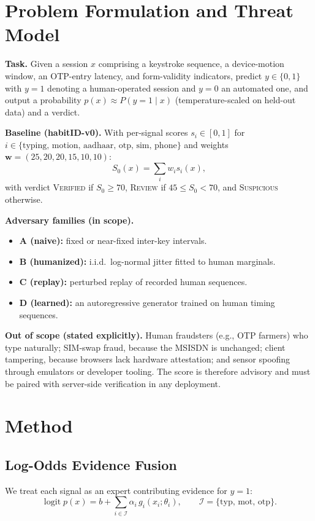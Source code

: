 \documentclass[conference]{IEEEtran}
\newcommand{\hid}{habitID}
\begin{document}
\section{Problem Formulation and Threat Model}
\label{sec:problem}
\textbf{Task.} Given a session $x$ comprising a keystroke sequence, a device-motion window, an OTP-entry latency, and form-validity indicators, predict $y\in\{0,1\}$ with $y{=}1$ denoting a human-operated session and $y{=}0$ an automated one, and output a probability $p(x)\approx P(y{=}1\mid x)$ (temperature-scaled on held-out data) and a verdict.

\textbf{Baseline (\hid{}-v0).} With per-signal scores $s_i\in[0,1]$ for $i\in\{\text{typing, motion, aadhaar, otp, sim, phone}\}$ and weights $\mathbf{w}=(25,20,20,15,10,10)$:
\begin{equation}
S_0(x)=\sum_{i} w_i s_i(x),
\end{equation}
with verdict \textsc{Verified} if $S_0\ge 70$, \textsc{Review} if $45\le S_0<70$, and \textsc{Suspicious} otherwise.

\textbf{Adversary families (in scope).}
\begin{itemize}
\item \textbf{A (naive):} fixed or near-fixed inter-key intervals.
\item \textbf{B (humanized):} i.i.d.\ log-normal jitter fitted to human marginals.
\item \textbf{C (replay):} perturbed replay of recorded human sequences.
\item \textbf{D (learned):} an autoregressive generator trained on human timing sequences.
\end{itemize}

\textbf{Out of scope (stated explicitly).} Human fraudsters (e.g., OTP farmers) who type naturally; SIM-swap fraud, because the MSISDN is unchanged; client tampering, because browsers lack hardware attestation; and sensor spoofing through emulators or developer tooling. The score is therefore advisory and must be paired with server-side verification in any deployment.

\section{Method}
\label{sec:method}

\subsection{Log-Odds Evidence Fusion}
We treat each signal as an expert contributing evidence for $y{=}1$:
\begin{equation}
\operatorname{logit} p(x)= b+\sum_{i\in\mathcal{I}}\alpha_i\, g_i(x_i;\theta_i),\qquad \mathcal{I}=\{\text{typ, mot, otp}\}.
\label{eq:fusion}
\end{equation}
\end{document}
